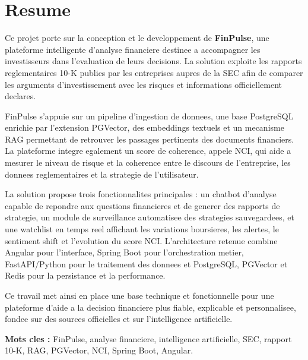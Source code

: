 \chapter*{Resume}

Ce projet porte sur la conception et le developpement de \textbf{FinPulse}, une
plateforme intelligente d'analyse financiere destinee a accompagner les investisseurs
dans l'evaluation de leurs decisions. La solution exploite les rapports reglementaires
10-K publies par les entreprises aupres de la SEC afin de comparer les arguments
d'investissement avec les risques et informations officiellement declares.

FinPulse s'appuie sur un pipeline d'ingestion de donnees, une base PostgreSQL enrichie
par l'extension PGVector, des embeddings textuels et un mecanisme RAG permettant de
retrouver les passages pertinents des documents financiers. La plateforme integre
egalement un score de coherence, appele NCI, qui aide a mesurer le niveau de risque et
la coherence entre le discours de l'entreprise, les donnees reglementaires et la
strategie de l'utilisateur.

La solution propose trois fonctionnalites principales : un chatbot d'analyse capable
de repondre aux questions financieres et de generer des rapports de strategie, un
module de surveillance automatisee des strategies sauvegardees, et une watchlist en
temps reel affichant les variations boursieres, les alertes, le sentiment shift et
l'evolution du score NCI. L'architecture retenue combine Angular pour l'interface,
Spring Boot pour l'orchestration metier, FastAPI/Python pour le traitement des donnees
et PostgreSQL, PGVector et Redis pour la persistance et la performance.

Ce travail met ainsi en place une base technique et fonctionnelle pour une plateforme
d'aide a la decision financiere plus fiable, explicable et personnalisee, fondee sur
des sources officielles et sur l'intelligence artificielle.

\textbf{Mots cles :} FinPulse, analyse financiere, intelligence artificielle, SEC,
rapport 10-K, RAG, PGVector, NCI, Spring Boot, Angular.

